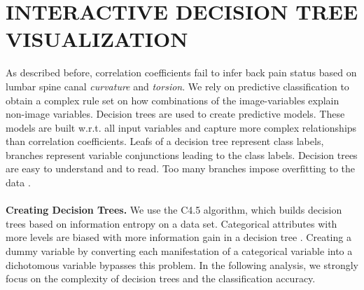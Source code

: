 \documentclass[a4paper,twoside]{style/article}
\begin{document}
\section{\uppercase{Interactive Decision Tree Visualization}}
\label{sec:DecisionTrees}
\noindent As described before, correlation coefficients fail to infer back pain status based on lumbar spine canal \emph{curvature} and \emph{torsion}.
We rely on predictive classification to obtain a complex rule set on how combinations of the image-variables explain non-image variables.
Decision trees are used to create predictive models.
These models are built w.r.t. all input variables and capture more complex relationships than correlation coefficients.
Leafs of a decision tree represent class labels, branches represent variable conjunctions leading to the class labels.
Decision trees are easy to understand and to read.
Too many branches impose overfitting to the data \cite{DecisionTree}.
\\\\
\noindent \textbf{Creating Decision Trees.}
We use the C4.5 algorithm, which builds decision trees based on information entropy on a data set.
Categorical attributes with more levels are biased with more information gain in a decision tree \cite{deng2011bias}.
Creating a dummy variable by converting each manifestation of a categorical variable into a dichotomous variable bypasses this problem.
In the following analysis, we strongly focus on the complexity of decision trees and the classification accuracy.
%
\end{document}
